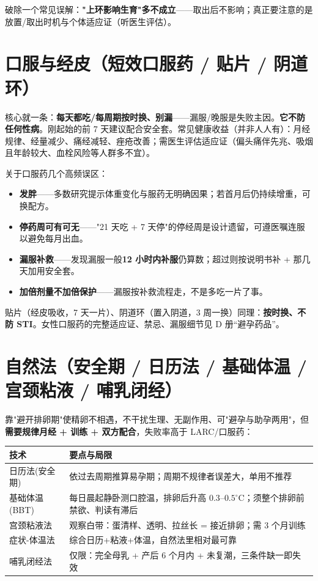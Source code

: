 \documentclass[12pt,UTF8,openany]{ctexbook}
\begin{document}
\noindent 破除一个常见误解：\textbf{"上环影响生育"多不成立}——取出后不影响；真正要注意的是放置/取出时机与个体适应证（听医生评估）。

\section{口服与经皮（短效口服药 / 贴片 / 阴道环）}

\noindent 核心就一条：\textbf{每天都吃/每周期按时换、别漏}——漏服/晚服是失败主因。\textbf{它不防任何性病}。刚起始的前 7 天建议配合安全套。常见健康收益（并非人人有）：月经规律、经量减少、痛经减轻、痤疮改善；需医生评估适应证（偏头痛伴先兆、吸烟且年龄较大、血栓风险等人群多不宜）。

\noindent 关于口服药几个高频误区：

\begin{itemize}[leftmargin=2em,itemsep=0.3em]
  \item \textbf{发胖}——多数研究提示体重变化与服药无明确因果；若首月后仍持续增重，可换配方。
  \item \textbf{停药周可有可无}——"21 天吃 + 7 天停"的停经周是设计遗留，可遵医嘱连服以避免每月出血。
  \item \textbf{漏服补救}——发现漏服一般\textbf{12 小时内补服}仍算数；超过则按说明书补 + 那几天加用安全套。
  \item \textbf{加倍剂量不加倍保护}——漏服按补救流程走，不是多吃一片了事。
\end{itemize}

\noindent 贴片（经皮吸收，7 天一片）、阴道环（置入阴道，3 周一换）同理：\textbf{按时换、不防 STI}。女性口服药的完整适应证、禁忌、漏服细节见 D 册“避孕药品”。

\section{自然法（安全期 / 日历法 / 基础体温 / 宫颈粘液 / 哺乳闭经）}

\noindent 靠"避开排卵期"使精卵不相遇，不干扰生理、无副作用、可"避孕与助孕两用"，但\textbf{需要规律月经 + 训练 + 双方配合}，失败率高于 LARC/口服药：

\begin{tabularx}{\textwidth}{lX}
\toprule
技术 & 要点与局限 \\
\midrule
日历法(安全期) & 依过去周期推算易孕期；周期不规律者误差大，单用不推荐 \\
基础体温(BBT) & 每日晨起静卧测口腔温，排卵后升高 $0.3$--$0.5^\circ$C；须整个排卵前禁欲、判读有滞后 \\
宫颈粘液法 & 观察白带：蛋清样、透明、拉丝长 = 接近排卵；需 3 个月训练 \\
症状-体温法 & 综合日历+粘液+体温，自然法里相对最可靠 \\
哺乳闭经法 & 仅限：完全母乳 + 产后 6 个月内 + 未复潮，三条件缺一即失效 \\
\bottomrule
\end{tabularx}
\end{document}
